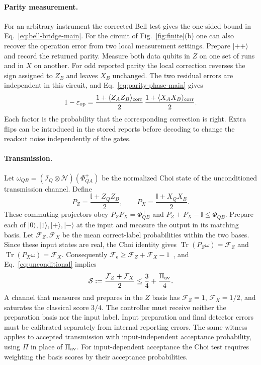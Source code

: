 \documentclass[aps,prl,twocolumn,superscriptaddress,longbibliography,reprint,floatfix]{revtex4-2}
\newcommand{\ket}[1]{\lvert #1\rangle}
\newcommand{\tr}{\operatorname{Tr}}
\newcommand{\id}{\mathcal I}
\newcommand{\Id}{\mathbb I}
\newcommand{\eps}{\varepsilon}
\newcommand{\Fe}{\mathcal F_{\mathrm e}}
\newcommand{\channel}{\mathcal N}
\begin{document}
\paragraph*{Parity measurement.}
For an arbitrary instrument the corrected Bell test gives the one-sided
bound in Eq.~\eqref{eq:bell-bridge-main}. For the circuit of
Fig.~\ref{fig:finite}(b) one can also recover the operation error
from two local measurement settings. Prepare $\ket{++}$ and record the
returned parity. Measure both data qubits in $Z$ on one set of runs
and in $X$ on another. For odd reported parity the local correction
reverses the sign assigned to $Z_B$ and leaves $X_B$ unchanged.
The two residual errors are independent in this circuit, and
Eq.~\eqref{eq:parity-phase-main} gives
\begin{equation}
 1-\eps_{\rm op}=
 \frac{1+\langle Z_A Z_B\rangle_{\rm corr}}{2}\,
 \frac{1+\langle X_A X_B\rangle_{\rm corr}}{2}.
 \label{eq:two-settings-parity}
\end{equation}
Each factor is the probability that the corresponding correction is
right. Extra flips can be introduced in the stored reports before
decoding to change the readout noise independently of the gates.

\paragraph*{Transmission.}
Let $\omega_{QB}=(\id_Q\otimes\channel)(\Phi^+_{QA})$ be the normalized Choi state of the unconditioned transmission channel. Define
\begin{equation}
 P_Z=\frac{\Id+Z_QZ_B}{2},\qquad
 P_X=\frac{\Id+X_QX_B}{2}.
\end{equation}
These commuting projectors obey $P_ZP_X=\Phi^+_{QB}$ and
$P_Z+P_X-\Id\le\Phi^+_{QB}$.
Prepare each of $\ket0,\ket1,\ket+,\ket-$ at the input and measure the
output in its matching basis. Let $\mathcal F_Z,\mathcal F_X$ be the mean correct-label
probabilities within the two bases. Since these input states are real, the Choi identity gives
$\tr(P_Z\omega)=\mathcal F_Z$ and $\tr(P_X\omega)=\mathcal F_X$. Consequently
$\Fe\ge \mathcal F_Z+\mathcal F_X-1$~\cite{Hofmann2005}, and Eq.~\eqref{eq:unconditional}
implies
\begin{equation}
 \mathcal S:=\frac{\mathcal F_Z+\mathcal F_X}{2}\le\frac34+\frac{\Pi_{\rm av}}4 .
 \label{eq:test}
\end{equation}
A channel that measures and prepares in the $Z$ basis has $\mathcal F_Z=1$,
$\mathcal F_X=1/2$, and saturates the classical score $3/4$. The controller must
receive neither the preparation basis nor the input label.
Input preparation and final detector errors must be calibrated separately
from internal reporting errors.
The same witness applies to accepted transmission with input-independent
acceptance probability, using $\Pi$ in place of $\Pi_{\rm av}$.
For input-dependent acceptance the Choi test requires weighting the
basis scores by their acceptance probabilities.
\end{document}
